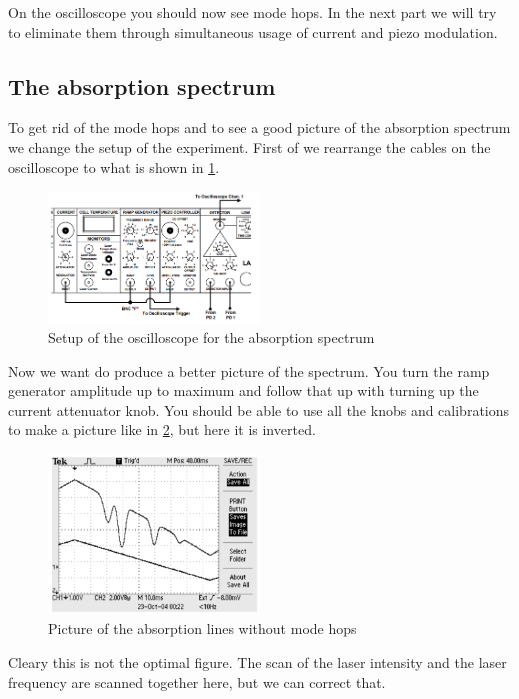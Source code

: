 On the oscilloscope you should now see mode hops.
In the next part we will try to eliminate them through simultaneous usage of current and piezo modulation.

\subsection{The absorption spectrum}
\label{ssec:exe3}

To get rid of the mode hops and to see a good picture of the absorption spectrum we change the setup of the experiment. 
First of we rearrange the cables on the oscilloscope to what is shown in \ref{fig:osci2}.
\begin{figure}
    \centering
    \includegraphics[width=0.5\textwidth]{images/generator2.png}
    \caption{Setup of the oscilloscope for the absorption spectrum \cite{V60}}
    \label{fig:osci2}
\end{figure}
Now we want do produce a better picture of the spectrum. 
You turn the ramp generator amplitude up to maximum and follow that up with turning up the current attenuator knob.
You should be able to use all the knobs and calibrations to make a picture like in \ref{fig:osci3}, but here it is inverted.
\begin{figure}
    \centering
    \includegraphics[width=0.5\textwidth]{images/oszi.png}
    \caption{Picture of the absorption lines without mode hops \cite{V60}}
    \label{fig:osci3}
\end{figure}
Cleary this is not the optimal figure.
The scan of the laser intensity and the laser frequency are scanned together here, but we can correct that.
